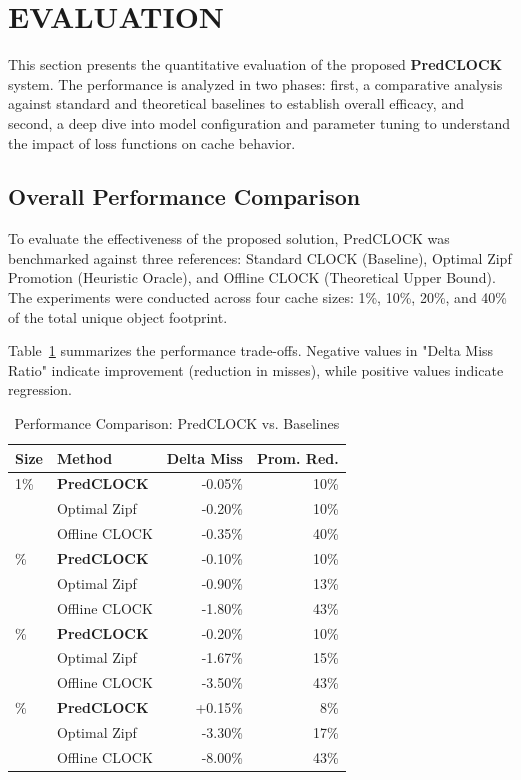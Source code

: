\section{EVALUATION}
\label{chap:evaluation}

This section presents the quantitative evaluation of the proposed
\textbf{PredCLOCK} system. The performance is analyzed in two phases:
first, a comparative analysis against standard and theoretical
baselines to establish overall efficacy, and second, a deep dive into
model configuration and parameter tuning to understand the impact of
loss functions on cache behavior.

\subsection{Overall Performance Comparison}
\label{sec:overall_performance}

To evaluate the effectiveness of the proposed solution, PredCLOCK was
benchmarked against three references: Standard CLOCK (Baseline),
Optimal Zipf Promotion (Heuristic Oracle), and Offline CLOCK
(Theoretical Upper Bound). The experiments were conducted across four
cache sizes: 1\%, 10\%, 20\%, and 40\% of the total unique object footprint.

Table~\ref{tab:comparison_all} summarizes the performance trade-offs.
Negative values in "Delta Miss Ratio" indicate improvement (reduction
in misses), while positive values indicate regression.

\begin{table}[t]
  \centering
  \small
  \caption{Performance Comparison: PredCLOCK vs. Baselines}
  \label{tab:comparison_all}
  \begin{tabular}{l l r r}
    \toprule
    \textbf{Size} & \textbf{Method} & \textbf{Delta Miss} &
    \textbf{Prom. Red.} \\
    \midrule
    1\% & \textbf{PredCLOCK} & -0.05\% & 10\% \\
    & Optimal Zipf & -0.20\% & 10\% \\
    & Offline CLOCK & -0.35\% & 40\% \\
    \addlinespace
    10\% & \textbf{PredCLOCK} & -0.10\% & 10\% \\
    & Optimal Zipf & -0.90\% & 13\% \\
    & Offline CLOCK & -1.80\% & 43\% \\
    \addlinespace
    20\% & \textbf{PredCLOCK} & -0.20\% & 10\% \\
    & Optimal Zipf & -1.67\% & 15\% \\
    & Offline CLOCK & -3.50\% & 43\% \\
    \addlinespace
    40\% & \textbf{PredCLOCK} & +0.15\% & 8\% \\
    & Optimal Zipf & -3.30\% & 17\% \\
    & Offline CLOCK & -8.00\% & 43\% \\
    \bottomrule
  \end{tabular}
\end{table}

